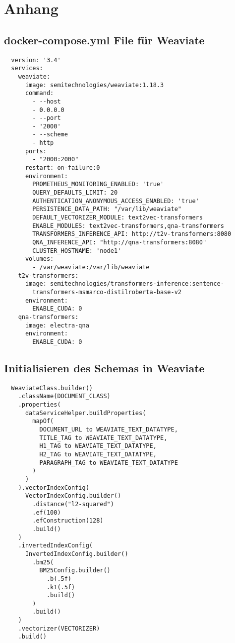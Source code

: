 \chapter{Anhang}
\label{chap:appendix}

\section{docker-compose.yml File für Weaviate}
\begin{verbatim}
  version: '3.4'
  services:
    weaviate:
      image: semitechnologies/weaviate:1.18.3
      command:
        - --host
        - 0.0.0.0
        - --port
        - '2000'
        - --scheme
        - http
      ports:
        - "2000:2000"
      restart: on-failure:0
      environment:
        PROMETHEUS_MONITORING_ENABLED: 'true'
        QUERY_DEFAULTS_LIMIT: 20
        AUTHENTICATION_ANONYMOUS_ACCESS_ENABLED: 'true'
        PERSISTENCE_DATA_PATH: "/var/lib/weaviate"
        DEFAULT_VECTORIZER_MODULE: text2vec-transformers
        ENABLE_MODULES: text2vec-transformers,qna-transformers
        TRANSFORMERS_INFERENCE_API: http://t2v-transformers:8080
        QNA_INFERENCE_API: "http://qna-transformers:8080"
        CLUSTER_HOSTNAME: 'node1'
      volumes:
        - /var/weaviate:/var/lib/weaviate
    t2v-transformers:
      image: semitechnologies/transformers-inference:sentence-
        transformers-msmarco-distilroberta-base-v2
      environment:
        ENABLE_CUDA: 0
    qna-transformers:
      image: electra-qna
      environment:
        ENABLE_CUDA: 0  
\end{verbatim}

\section{Initialisieren des Schemas in Weaviate}
\begin{verbatim}
  WeaviateClass.builder()
    .className(DOCUMENT_CLASS)
    .properties(
      dataServiceHelper.buildProperties(
        mapOf(
          DOCUMENT_URL to WEAVIATE_TEXT_DATATYPE,
          TITLE_TAG to WEAVIATE_TEXT_DATATYPE,
          H1_TAG to WEAVIATE_TEXT_DATATYPE,
          H2_TAG to WEAVIATE_TEXT_DATATYPE,
          PARAGRAPH_TAG to WEAVIATE_TEXT_DATATYPE
        )
      )
    ).vectorIndexConfig(
      VectorIndexConfig.builder()
        .distance("l2-squared")
        .ef(100)
        .efConstruction(128)
        .build()
    )
    .invertedIndexConfig(
      InvertedIndexConfig.builder()
        .bm25(
          BM25Config.builder()
            .b(.5f)
            .k1(.5f)
            .build()
        )
        .build()
    )
    .vectorizer(VECTORIZER)
    .build()
\end{verbatim}
